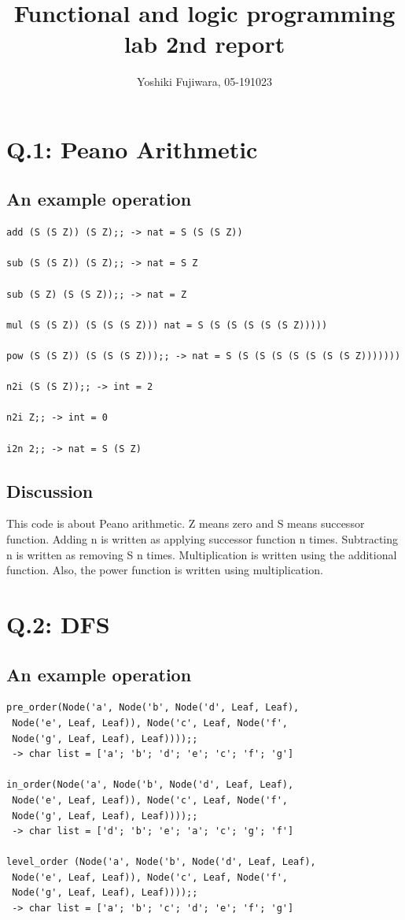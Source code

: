 \documentclass[uplatex,12pt]{jsarticle}
\title {Functional and logic programming lab 2nd report}
\date{}
\begin{document}
\author{Yoshiki Fujiwara, 05-191023}
\maketitle

\section{Q.1: Peano Arithmetic}

\subsection{An example operation}

\begin{lstlisting}[caption=test code]
add (S (S Z)) (S Z);; -> nat = S (S (S Z))

sub (S (S Z)) (S Z);; -> nat = S Z

sub (S Z) (S (S Z));; -> nat = Z

mul (S (S Z)) (S (S (S Z))) nat = S (S (S (S (S (S Z)))))

pow (S (S Z)) (S (S (S Z)));; -> nat = S (S (S (S (S (S (S (S Z)))))))

n2i (S (S Z));; -> int = 2

n2i Z;; -> int = 0

i2n 2;; -> nat = S (S Z)
\end{lstlisting}

\subsection{Discussion}
This code is about Peano arithmetic. Z means zero and S means successor function. Adding n is written as applying successor function n times. Subtracting n is written as removing S n times. Multiplication is written using the additional function. Also, the power function is written using multiplication.

\section{Q.2: DFS}

\subsection{An example operation}
\begin{lstlisting}[caption=test code]
pre_order(Node('a', Node('b', Node('d', Leaf, Leaf),
 Node('e', Leaf, Leaf)), Node('c', Leaf, Node('f',
 Node('g', Leaf, Leaf), Leaf))));;
 -> char list = ['a'; 'b'; 'd'; 'e'; 'c'; 'f'; 'g']

in_order(Node('a', Node('b', Node('d', Leaf, Leaf),
 Node('e', Leaf, Leaf)), Node('c', Leaf, Node('f',
 Node('g', Leaf, Leaf), Leaf))));;
 -> char list = ['d'; 'b'; 'e'; 'a'; 'c'; 'g'; 'f']

level_order (Node('a', Node('b', Node('d', Leaf, Leaf),
 Node('e', Leaf, Leaf)), Node('c', Leaf, Node('f',
 Node('g', Leaf, Leaf), Leaf))));;
 -> char list = ['a'; 'b'; 'c'; 'd'; 'e'; 'f'; 'g']
\end{lstlisting}
\end{document}
